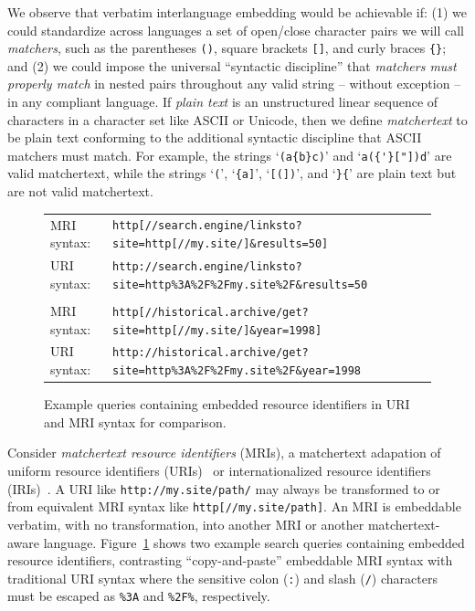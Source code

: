 We observe that verbatim interlanguage embedding would be achievable if:
(1)
we could standardize across languages
a set of open/close character pairs
we will call \emph{matchers},
such as the parentheses \verb|()|,
square brackets \verb|[]|,
and curly braces \verb|{}|;
and
(2) 
we could impose the universal ``syntactic discipline''
that \emph{matchers must properly match} in nested pairs
throughout any valid string -- without exception --
in any compliant language.
If \emph{plain text} is an unstructured linear sequence of characters
in a character set like ASCII or Unicode,
then we define \emph{matchertext} to be plain text
conforming to the additional syntactic discipline
that ASCII matchers must match.
For example, the strings `\verb|(a{b}c)|' and `\verb|a({'}["])d|'
are valid matchertext,
while the strings
`\verb|(|', `\verb|{a]|', `\verb|[(])|', and `\verb|}{|'
are plain text but are not valid matchertext.

\begin{figure}[t]
\begin{center}
\begin{small}
\begin{tabular}{ll}
MRI syntax:	& \verb|http[//search.engine/linksto?site=http[//my.site/]&results=50]| \\
URI syntax:	& \verb|http://search.engine/linksto?site=http%3A%2F%2Fmy.site%2F&results=50| \\
\\
MRI syntax:	& \verb|http[//historical.archive/get?site=http[//my.site/]&year=1998]| \\
URI syntax:	& \verb|http://historical.archive/get?site=http%3A%2F%2Fmy.site%2F&year=1998| \\
\end{tabular}
\end{small}
\end{center}
\caption{Example queries containing embedded resource identifiers
	in URI and MRI syntax for comparison.}
\label{fig:search-query}
\end{figure}

Consider \emph{matchertext resource identifiers} (MRIs),
a matchertext adapation of
uniform resource identifiers (URIs)~\cite{rfc3986} or
internationalized resource identifiers (IRIs)~\cite{rfc3987}.
A URI like \verb|http://my.site/path/|
may always be transformed to or from
equivalent MRI syntax like \verb|http[//my.site/path]|.
An MRI is embeddable verbatim, with no transformation,
into another MRI or another matchertext-aware language.
Figure~\ref{fig:search-query} shows two example search queries
containing embedded resource identifiers,
contrasting ``copy-and-paste'' embeddable MRI syntax
with traditional URI syntax where the sensitive
colon (\verb|:|) and slash (\verb|/|) characters
must be escaped as \verb|%3A| and \verb|%2F%|, respectively.

